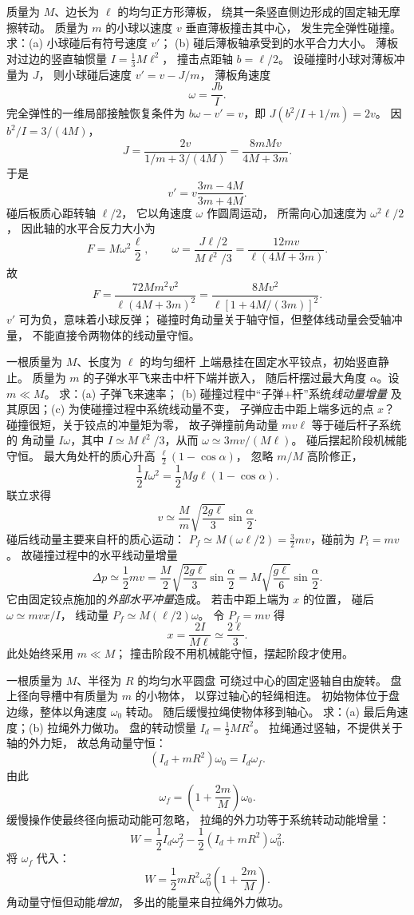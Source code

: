 质量为 $M$、边长为 $\ell$ 的均匀正方形薄板，
绕其一条竖直侧边形成的固定轴无摩擦转动。
质量为 $m$ 的小球以速度 $v$ 垂直薄板撞击其中心，
发生完全弹性碰撞。
求：(a) 小球碰后有符号速度 $v'$；
(b) 碰后薄板轴承受到的水平合力大小。
\exsolution
薄板对过边的竖直轴惯量
$I=\frac13M\ell^2$，
撞击点距轴 $b=\ell/2$。
设碰撞时小球对薄板冲量为 $J$，
则小球碰后速度 $v'=v-J/m$，
薄板角速度
\[
\omega=\frac{Jb}{I}.
\]
完全弹性的一维局部接触恢复条件为
$b\omega-v'=v$，即
$J(b^2/I+1/m)=2v$。
因 $b^2/I=3/(4M)$，
\[
J=\frac{2v}{1/m+3/(4M)}
=\frac{8mMv}{4M+3m}.
\]
于是
\[
\boxed{v'=v\frac{3m-4M}{3m+4M}}.
\]
碰后板质心距转轴 $\ell/2$，
它以角速度 $\omega$ 作圆周运动，
所需向心加速度为 $\omega^2\ell/2$，
因此轴的水平合反力大小为
\[
F=M\omega^2\frac\ell2,\qquad
\omega=\frac{J\ell/2}{M\ell^2/3}
=\frac{12mv}{\ell(4M+3m)}.
\]
故
\[
\boxed{F=\frac{72Mm^2v^2}{\ell(4M+3m)^2}
=\frac{8Mv^2}{\ell[1+4M/(3m)]^2}}.
\]
\excheck $v'$ 可为负，意味着小球反弹；
碰撞时角动量关于轴守恒，但整体线动量会受轴冲量，
不能直接令两物体的线动量守恒。

一根质量为 $M$、长度为 $\ell$ 的均匀细杆
上端悬挂在固定水平铰点，初始竖直静止。
质量为 $m$ 的子弹水平飞来击中杆下端并嵌入，
随后杆摆过最大角度 $\alpha$。设 $m\ll M$。
求：(a) 子弹飞来速率；
(b) 碰撞过程中“子弹+杆”系统\emph{线动量增量}
及其原因；(c) 为使碰撞过程中系统线动量不变，
子弹应击中距上端多远的点 $x$？
\exsolution
碰撞很短，关于铰点的冲量矩为零，
故子弹撞前角动量 $mv\ell$ 等于碰后杆子系统的
角动量 $I\omega$，其中
$I\simeq M\ell^2/3$，从而
$\omega\simeq3mv/(M\ell)$。
碰后摆起阶段机械能守恒。
最大角处杆的质心升高
$\frac\ell2(1-\cos\alpha)$，
忽略 $m/M$ 高阶修正，
\[
\frac12I\omega^2
=\frac12Mg\ell(1-\cos\alpha).
\]
联立求得
\[
\boxed{v\simeq\frac M m
\sqrt{\frac{2g\ell}{3}}\sin\frac\alpha2}.
\]
碰后线动量主要来自杆的质心运动：
$P_f\simeq M(\omega\ell/2)
=\frac32mv$，碰前为 $P_i=mv$。
故碰撞过程中的水平线动量增量
\[
\boxed{\Delta p\simeq\frac12mv
=\frac M2\sqrt{\frac{2g\ell}{3}}\sin\frac\alpha2
=M\sqrt{\frac{g\ell}{6}}\sin\frac\alpha2}.
\]
它由固定铰点施加的\emph{外部水平冲量}造成。
若击中距上端为 $x$ 的位置，
碰后 $\omega\simeq mvx/I$，
线动量 $P_f\simeq M(\ell/2)\omega$。
令 $P_f=mv$ 得
\[
\boxed{x=\frac{2I}{M\ell}\simeq\frac{2\ell}{3}}.
\]
\excheck 此处始终采用 $m\ll M$；
撞击阶段不用机械能守恒，摆起阶段才使用。

一根质量为 $M$、半径为 $R$ 的均匀水平圆盘
可绕过中心的固定竖轴自由旋转。
盘上径向导槽中有质量为 $m$ 的小物体，
以穿过轴心的轻绳相连。
初始物体位于盘边缘，整体以角速度 $\omega_0$ 转动。
随后缓慢拉绳使物体移到轴心。
求：(a) 最后角速度；(b) 拉绳外力做功。
\exsolution
盘的转动惯量
$I_d=\frac12MR^2$。
拉绳通过竖轴，不提供关于轴的外力矩，
故总角动量守恒：
\[
(I_d+mR^2)\omega_0=I_d\omega_f.
\]
由此
\[
\boxed{\omega_f=\left(1+\frac{2m}{M}\right)\omega_0}.
\]
缓慢操作使最终径向振动动能可忽略，
拉绳的外力功等于系统转动动能增量：
\[
W=\frac12I_d\omega_f^2
-\frac12(I_d+mR^2)\omega_0^2.
\]
将 $\omega_f$ 代入：
\[
\boxed{W=\frac12mR^2\omega_0^2
\left(1+\frac{2m}{M}\right)}.
\]
\excheck 角动量守恒但动能\emph{增加}，
多出的能量来自拉绳外力做功。

